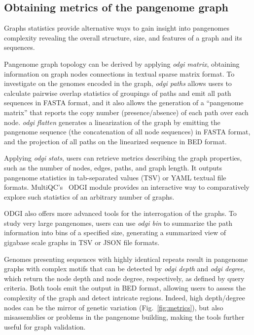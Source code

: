 \documentclass{bioinfo}
\begin{document}
\subsection{Obtaining metrics of the pangenome graph}
\label{sec:metrics}

Graphs statistics provide alternative ways to gain insight into pangenomes complexity revealing the overall structure, size, and features of a graph and its sequences.

Pangenome graph topology can be derived by applying \textit{odgi matrix}, obtaining information on graph nodes connections in textual sparse matrix format.
To investigate on the genomes encoded in the graph, \textit{odgi paths} allows users to calculate pairwise overlap statistics of groupings of paths and emit all path sequences in FASTA format, and it also allows the generation of a ``pangenome matrix'' that reports the copy number (presence/absence) of each path over each node.
\textit{odgi flatten} generates a linearization of the graph by emitting the pangenome sequence (the concatenation of all node sequences) in FASTA format, and the projection of all paths on the linearized sequence in BED format.

Applying \textit{odgi stats}, users can retrieve metrics describing the graph properties, such as the number of nodes, edges, paths, and graph length.
It outputs pangenome statistics in tab-separated values (TSV) or YAML textual file formats.
MultiQC's~\citep{Ewels_2016} ODGI module %
provides an interactive way to comparatively explore such statistics of an arbitrary number of graphs.

ODGI also offers more advanced tools for the interrogation of the graphs.
To study very large pangenomes, users can use \textit{odgi bin} to summarize the path information into bins of a specified size, generating a summarized view of gigabase scale graphs in TSV or JSON file formats.

Genomes presenting sequences with highly identical repeats result in pangenome graphs with complex motifs that can be detected by \textit{odgi depth} and \textit{odgi degree}, which return the node depth and node degree, respectively, as defined by query criteria.
Both tools emit the output in BED format, allowing users to assess the complexity of the graph and detect intricate regions.
Indeed, high depth/degree nodes can be the mirror of genetic variation (Fig.~\ref{fig:metrics}), but also misassemblies or problems in the pangenome building, making the tools further useful for graph validation.
\end{document}

